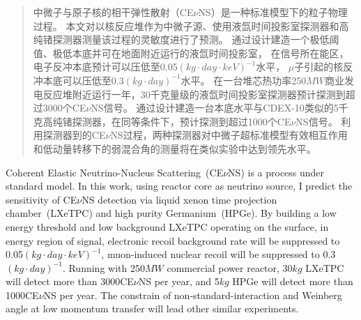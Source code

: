 

\begin{abstract}
  中微子与原子核的相干弹性散射（CE$\nu$NS）是一种标准模型下的粒子物理过程。
  本文对以核反应堆作为中微子源、使用液氙时间投影室探测器和高纯锗探测器测量该过程的灵敏度进行了预测。
  通过设计建造一个极低阈值、极低本底并可在地面附近运行的液氙时间投影室，
  在信号所在能区，电子反冲本底预计可以压低至0.05$\left(\si{kg}\cdot\si{day}\cdot\si{keV}\right)^{-1}$水平，
  $\mu$子引起的核反冲本底可以压低至0.3$\left(\si{kg}\cdot\si{day}\right)^{-1}$水平。
  在一台堆芯热功率250$\si{MW}$商业发电反应堆附近运行一年，30千克量级的液氙时间投影室探测器预计探测到超过3000个CE$\nu$NS信号。
  通过设计建造一台本底水平与CDEX-10类似的5千克高纯锗探测器，在同等条件下，预计探测到超过1000个CE$\nu$NS信号。
  利用探测器到的CE$\nu$NS过程，两种探测器对中微子超标准模型有效相互作用和低动量转移下的弱混合角的测量将在类似实验中达到领先水平。

\end{abstract}

\begin{abstract*}
  Coherent Elastic Neutrino-Nucleus Scattering~(CE$\nu$NS) is a process under standard model.
  In this work, using reactor core as neutrino source, 
  I predict the sensitivity of CE$\nu$NS detection via liquid xenon time projection chamber~(LXeTPC) and high purity Germanium~(HPGe).
  By building a low energy threshold and low background LXeTPC operating on the surface,
  in energy region of signal, electronic recoil background rate will be suppressed to 0.05$\left(\si{kg}\cdot\si{day}\cdot\si{keV}\right)^{-1}$,
  muon-induced nuclear recoil will be suppressed to 0.3$\left(\si{kg}\cdot\si{day}\right)^{-1}$. 
  Running with 250$\si{MW}$ commercial power reactor, 30$\si{kg}$ LXeTPC will detect more than 3000CE$\nu$NS per year, 
  and 5$\si{kg}$ HPGe will detect more than 1000CE$\nu$NS per year. 
  The constrain of non-standard-interaction and Weinberg angle at low momentum transfer will lead other similar experiments.

\end{abstract*}
